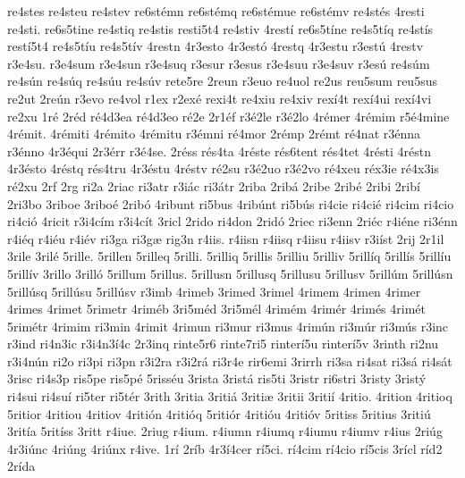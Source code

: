 {re4stes
re4steu
re4stev
re6st^^e9mn
re6st^^e9mq
re6st^^e9mue
re6st^^e9mv
re4st^^e9s
4resti
re4sti.
re6s5tine
re4stiq
re4stis
resti5t4
re4stiv
4rest^^ed
re6s5t^^edne
re4s5t^^edq
re4st^^eds
rest^^ed5t4
re4s5t^^edu
re4s5t^^edv
4restn
4r3esto
4r3est^^f3
4restq
4r3estu
r3est^^fa
4restv
r3e4su.
r3e4sum
r3e4sun
r3e4suq
r3esur
r3esus
r3e4suu
r3e4suv
r3es^^fa
re4s^^fam
re4s^^fan
re4s^^faq
re4s^^fau
re4s^^fav
rete5re
2reun
r3euo
re4uol
re2us
reu5sum
reu5sus
re2ut
2re^^fan
r3evo
re4vol
r1ex
r2ex^^e9
rexi4t
re4xiu
re4xiv
rex^^ed4t
rex^^ed4ui
rex^^ed4vi
re2xu
1r^^e9
2r^^e9d
r^^e94d3ea
r^^e94d3eo
r^^e92e
2r1^^e9f
r3^^e92le
r3^^e92lo
4r^^e9mer
4r^^e9mim
r5^^e94mine
4r^^e9mit.
4r^^e9miti
4r^^e9mito
4r^^e9mitu
r3^^e9mni
r^^e94mor
2r^^e9mp
2r^^e9mt
r^^e94nat
r3^^e9nna
r3^^e9nno
4r3^^e9qui
2r3^^e9rr
r3^^e94se.
2r^^e9ss
r^^e9s4ta
4r^^e9ste
r^^e9s6tent
r^^e9s4tet
4r^^e9sti
4r^^e9stn
4r3^^e9sto
4r^^e9stq
r^^e9s4tru
4r3^^e9stu
4r^^e9stv
r^^e92su
r3^^e92uo
r3^^e92vo
r^^e94xeu
r^^e9x3ie
r^^e94x3is
r^^e92xu
2rf
2rg
ri2a
2riac
ri3atr
r3i^^e1c
ri3^^e1tr
2riba
2rib^^e1
2ribe
2rib^^e9
2ribi
2rib^^ed
2ri3bo
3riboe
3ribo^^e9
2rib^^f3
4ribunt
ri5bus
4rib^^fant
ri5b^^fas
ri4cie
ri4ci^^e9
ri4cim
ri4cio
ri4ci^^f3
4ricit
r3i4c^^edm
r3i4c^^edt
3ricl
2rido
ri4don
2rid^^f3
2riec
ri3enn
2ri^^e9c
r4i^^e9ne
ri3^^e9nn
r4i^^e9q
r4i^^e9u
r4i^^e9v
ri3ga
ri3g^^e6
rig3n
r4iis.
r4iisn
r4iisq
r4iisu
r4iisv
r3i^^edst
2rij
2r1il
3rile
3ril^^e9
5rille.
5rillen
5rilleq
5rilli.
5rilliq
5rillis
5rilliu
5rilliv
5rill^^edq
5rill^^eds
5rill^^edu
5rill^^edv
3rillo
3rill^^f3
5rillum
5rillus.
5rillusn
5rillusq
5rillusu
5rillusv
5rill^^fam
5rill^^fasn
5rill^^fasq
5rill^^fasu
5rill^^fasv
r3imb
4rimeb
3rimed
3rimel
4rimem
4rimen
4rimer
4rimes
4rimet
5rimetr
4rim^^e9b
3ri5m^^e9d
3ri5m^^e9l
4rim^^e9m
4rim^^e9r
4rim^^e9s
4rim^^e9t
5rim^^e9tr
4rimim
ri3min
4rimit
4rimun
ri3mur
ri3mus
4rim^^fan
ri3m^^far
ri3m^^fas
r3inc
r3ind
ri4n3ic
r3i4n3^^ed4c
2r3inq
rinte5r6
rinte7ri5
rinter^^ed5u
rinter^^ed5v
3rinth
ri2nu
r3i4n^^fan
ri2o
ri3pi
ri3pn
r3i2ra
r3i2r^^e1
ri3r4e
rir6emi
3rirrh
ri3sa
ri4sat
ri3s^^e1
ri4s^^e1t
3risc
ri4s3p
ris5pe
ris5p^^e9
5riss^^e9u
3rista
3rist^^e1
ris5ti
3ristr
ri6stri
3risty
3rist^^fd
ri4sui
ri4su^^ed
ri5ter
ri5t^^e9r
3rith
3ritia
3riti^^e1
3riti^^e6
3ritii
3riti^^ed
4ritio.
4rition
4ritioq
5ritior
4ritiou
4ritiov
4riti^^f3n
4riti^^f3q
5riti^^f3r
4riti^^f3u
4riti^^f3v
5ritiss
5ritius
3riti^^fa
3rit^^eda
5rit^^edss
3ritt
r4iue.
2riug
r4ium.
r4iumn
r4iumq
r4iumu
r4iumv
r4ius
2ri^^fag
4r3i^^fanc
4ri^^fang
4ri^^fanx
r4ive.
1r^^ed
2r^^edb
4r3^^ed4cer
r^^ed5ci.
r^^ed4cim
r^^ed4cio
r^^ed5cis
3r^^edcl
r^^edd2
2r^^edda
}

